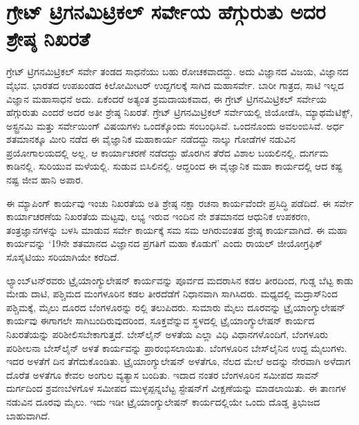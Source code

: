 
\chapter{ಗ್ರೇಟ್​ ಟ್ರಿಗನಮಿಟ್ರಿಕಲ್​ ಸರ್ವೇಯ ಹೆಗ್ಗುರುತು ಅದರ ಶ್ರೇಷ್ಠ ನಿಖರತೆ}

\vskip -8pt

ಗ್ರೇಟ್​ ಟ್ರಿಗನಮಿಟ್ರಿಕಲ್​ ಸರ್ವೇ ತಂಡದ ಸಾಧನೆಯು ಬಹು ರೋಚಕವಾದದ್ದು. ಅದು ವಿಜ್ಞಾನದ ವಿಜಯ, ವಿಜ್ಞಾನದ ವೈಭವ. ಭಾರತದ ಉಪಖಂಡದ  ಕಿಲೋಮೀಟರ್​ ಉದ್ದಗಲಕ್ಕೆ ಸಾಗಿದ ಮಹಾಸರ್ವೇ. ಬಾರೀ ಗಾತ್ರದ, ಸಾಟಿ ಇಲ್ಲದ ವಿಜ್ಞಾನ ಮಹಾಸಾಧನೆ ಅದು. ಏಕೆಂದರೆ ಅತ್ಯಂತ ಶ್ರಮದಾಯಕವಾದ, ಈ ಗ್ರೇಟ್​ ಟ್ರಿಗನಮಿಟ್ರಿಕಲ್​ ಸರ್ವೇಯ ಹೆಗ್ಗುರುತು ಎಂದರೆ ಅದರ ಅತೀ ಶ್ರೇಷ್ಠ ನಿಖರತೆ. ಗ್ರೇಟ್​ ಟ್ರಿಗನಮಿಟ್ರಿಕಲ್​ ಸರ್ವೇಯಲ್ಲಿ ಜಿಯೋಡೆಸಿ, ಮ್ಯಾಥಮೆಟಿಕ್ಸ್​, ಅಸ್ಟ್ರನಮಿ ಮತ್ತು ಸರ್ವೇಯಿಂಗ್​ ವಿಷಯಗಳು ಒಂದಕ್ಕೊಂದು ಸಂಬಂಧಿಸಿವೆ. ಒಂದನೊಂದು ಅವಲಂಬಿಸಿವೆ. ಅರ್ಧ ಶತಮಾನಕ್ಕೂ ಮೀರಿ ನಡೆದ ಈ ವೈಜ್ಞಾನಿಕ ಮಹಾಕಾರ್ಯ ನಡೆದದ್ದು ನಾಲ್ಕು ಗೋಡೆಗಳ ನಡುವಿನ ಪ್ರಯೋಗಾಲಯದಲ್ಲಿ ಅಲ್ಲ. ಆ ಕಾರ್ಯಾಚರಣೆ ನಡೆದದ್ದು ಹೊರಗಿನ ತೆರೆದ ವಿಶಾಲ ಬಯಲಿನಲ್ಲಿ. ದುರ್ಗಮ ಕಾಡಿನಲ್ಲಿ. ಸುರಿಯುವ ಮಳೆಯಲ್ಲಿ. ಸುಡುವ ಬಿಸಿಲಿನಲ್ಲಿ. ಆದ್ದರಿಂದ ಈ ವೈಜ್ಞಾನಿಕ ಮಹಾ ಕಾರ್ಯದಲ್ಲಿ ಆದ ಕಷ್ಟ ನಷ್ಟ ಜೀವ ಹಾನಿ ಅಪಾರ.

ಈ ಮ್ಯಾಪಿಂಗ್​ ಕಾರ್ಯವು ಇಂಚು ನಿಖರತೆಯ ಅತಿ ಶ್ರೇಷ್ಠ ನಕ್ಷಾ ರಚನಾ ಕಾರ್ಯವೆಂದೇ ಪ್ರಸಿದ್ಧಿ ಪಡೆದಿದೆ. ಈ ಸರ್ವೇ ಕಾರ್ಯಾಚರಣೆಯ ನಿಖರತೆಯ ಮಟ್ಟವು, ಲಭ್ಯ ಇರುವ ಇಂದಿನ ನೇ ಶತಮಾನದ ಆಧುನಿಕ ಉಪಕರಣ, ತಂತ್ರಜ್ಞಾನಗಳನ್ನು ಬಳಸಿ ಮಾಡುವ ಸರ್ವೇ ಕಾರ್ಯಕ್ಕೆ ಸಮ ಸಮ ಆಗಿರುವಂತಹ ಶ್ರೇಷ್ಠ ಕಾರ್ಯವಾಗಿದೆ. ಈ ಮಹಾ ಕಾರ್ಯವನ್ನು ‘19ನೇ ಶತಮಾನದ ವಿಜ್ಞಾನದ ಪ್ರಗತಿಗೆ ಮಹಾ ಕೊಡುಗೆ’ ಎಂದು ರಾಯಲ್​ ಜೀಯೋಗ್ರಫಿಕ್​ ಸೊಸೈಟಿಯು ಸರಿಯಾಗಿಯೇ ಕರೆದಿದೆ.

\newpage

ಲ್ಯಾಂಬ್​ಟನ್​ರವರು ಟ್ರೈಯಾಂಗ್ಯುಲೇಷನ್​ ಕಾರ್ಯವನ್ನು ಪೂರ್ವದ ಮದರಾಸಿನ ಕಡಲ ತೀರದಿಂದ, ಗುಡ್ಡ ಬೆಟ್ಟ ಕಾಡು ಮೇಡು ದಾಟಿ, ಪಶ್ಚಿಮದ ಮಂಗಳೂರಿನ ಕಡಲ ತೀರದೆಡೆಗೆ ನಿಧಾನವಾಗಿ ಸಾಗಿಸಿದರು. ಮಧ್ಯದಲ್ಲಿ ಮದ್ರಾಸ್​ನಿಂದ ಪಶ್ಚಿಮಕ್ಕೆ,  ಮೈಲು ದೂರದ ಬೆಂಗಳೂರನ್ನು  ರಲ್ಲಿ ತಲುಪಿದರು. ಸುಮಾರು  ಮೈಲು ದೂರವನ್ನು ಟ್ರೈಯಾಂಗ್ಯುಲೇಷನ್​ ಕಾರ್ಯವು ಈಗಾಗಲೇ ಸಾಗಿಬಂದಿರುವುದರಿಂದ, ಸೂಕ್ತವೆನ್ನುವ ಸ್ಥಳದಲ್ಲಿ ಟ್ರೈಯಾಂಗ್ಯುಲೇಷನ್​ ಕಾರ್ಯದ ನಿಖರತೆಯನ್ನು ಪರಿಶೀಲಿಸಬೇಕಾಗುತ್ತದೆ. ಬೇಸ್‌ಲೈನ್​ ಅಳತೆಯ ಎಲ್ಲಾ ವಿಧಿ ವಿಧಾನಗಳೊಂದಿಗೆ, ಬೆಂಗಳೂರು ಪರಿಶೀಲನಾ ಬೇಸ್‌ಲೈನ್​ ಅಳತೆ ಕಾರ್ಯವನ್ನು ಪ್ರಾರಂಭಿಸಲಾಯಿತು. ಬೆಂಗಳೂರಿನ ಬೇಸ್‌ಲೈನಿನ ಉದ್ದ  ಮೈಲುಗಳು. ಇದರ ಅಳತೆಗೆ  ದಿನ ತೆಗೆದುಕೊಂಡಿತು. ಟ್ರೈಯಾಂಗ್ಯುಲೇಷನ್​ ಅಳತೆಗೂ, ನೆಲದ ಮೇಲೆ ಅದನ್ನು ನೇರವಾಗಿ ಅಳೆದಾಗ ದೊರೆತ ಅಳತೆಗೂ ಕೇವಲ  ಅಂಗುಲ ವ್ಯತ್ಯಾಸ ಬಂದಿತು. ಇದಾದ ನಂತರ ಬೆಂಗಳೂರಿನ ಸಮೀಪದ ಸಾವನ್​ ದುರ್ಗದಿಂದ ಶ್ರವಣಬೆಳಗೊಳ ಸಮೀಪದ ಮುಳ್ಳಪ್ಪನ್ನಬೆಟ್ಟ ಸ್ಟೇಷನ್​ಗೆ ವೀಕ್ಷಣೆಯನ್ನು ಮಾಡಲಾಯಿತು. ಈ ತಾಣಗಳ ನಡುವಿನ ದೂರವು  ಮೈಲು. ಇದು ಇಡೀ ಟ್ರೈಯಾಂಗ್ಯುಲೇಷನ್​ ಕಾರ್ಯದಲ್ಲಿಯೇ ಒಂದು ದೊಡ್ಡ ತ್ರಿಭುಜದ ಬಾಹುವಾಗಿದೆ.

\vskip 5pt

